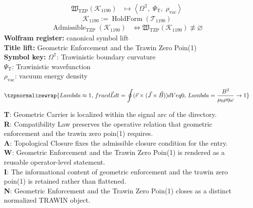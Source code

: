 \noindent
\begin{minipage}[t]{0.48\linewidth}
\begingroup
\small
\[
\begin{aligned}
\mathfrak{W}_{\mathrm{TZP}}\!\left(\mathcal{K}_{1190}\right)
&\longmapsto
\left\langle \Omega^{\mathbb{T}},\; \Psi_{\mathrm{T}},\; \rho_{\mathrm{vac}} \right\rangle
\end{aligned}
\]
\[
\mathcal{K}_{1190}
:=
\operatorname{HoldForm}\!\left(\mathcal{T}_{1190}\right)
\]
\[
\begin{aligned}
\operatorname{Admissible}_{\mathrm{TZP}}\!\left(\mathcal{K}_{1190}\right)
&\Longleftrightarrow
\mathfrak{W}_{\mathrm{TZP}}\!\left(\mathcal{K}_{1190}\right)\not\equiv\varnothing
\end{aligned}
\]
\textbf{Wolfram register:} canonical symbol lift\\
\textbf{Title lift:} Geometric Enforcement and the Trawin Zero Poin(1)\\
\textbf{Symbol key:} \(\Omega^{\mathbb{T}}\): Trawinistic boundary curvature\\ \(\Psi_{\mathrm{T}}\): Trawinistic wavefunction\\ \(\rho_{\mathrm{vac}}\): vacuum energy density
\par
\endgroup
\end{minipage}\hfill
\begin{minipage}[t]{0.48\linewidth}
\[
\tzpnormalizewrap{Lambda \approx 1,\,frac{d\vec{L}}{dt} = \oint (\vec{r} \times (\vec{J} \times \vec{B})) dV  eq 0,\,Lambda = \frac{B^2}{\mu_0 \rho \eta \omega} \to 1}
\]

\small
\textbf{T}: Geometric Carrier is localized within the signal arc of the directory.\\
\textbf{R}: Compatibility Law preserves the operative relation that geometric enforcement and the trawin zero poin(1) requires.\\
\textbf{A}: Topological Closure fixes the admissible closure condition for the entry.\\
\textbf{W}: Geometric Enforcement and the Trawin Zero Poin(1) is rendered as a reusable operator-level statement.\\
\textbf{I}: The informational content of geometric enforcement and the trawin zero poin(1) is retained rather than flattened.\\
\textbf{N}: Geometric Enforcement and the Trawin Zero Poin(1) closes as a distinct normalized TRAWIN object.
\normalsize
\end{minipage}

